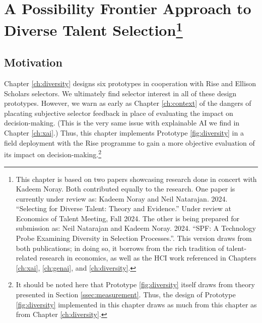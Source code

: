 \chapter[A Possibility Frontier Approach to Diverse Talent Selection]{\label{ch:spf}A Possibility Frontier Approach to Diverse Talent Selection\footnote{This chapter is based on two papers showcasing research done in concert with Kadeem Noray. Both contributed equally to the research. One paper is currently under review as: Kadeem Noray and Neil Natarajan. 2024. “Selecting for Diverse Talent: Theory and Evidence.” Under review at Economics of Talent Meeting, Fall 2024. The other is being prepared for submission as: Neil Natarajan and Kadeem Noray. 2024. “SPF: A Technology Probe Examining Diversity in Selection Processes.”. This version draws from both publications; in doing so, it borrows from the rich tradition of talent-related research in economics, as well as the HCI work referenced in Chapters \ref{ch:xai}, \ref{ch:genai}, and \ref{ch:diversity}.}}

\minitoc

\section{Motivation}
Chapter \ref{ch:diversity} designs six prototypes in cooperation with Rise and Ellison Scholars selectors. We ultimately find selector interest in all of these design prototypes. However, we warn as early as Chapter \ref{ch:context} of the dangers of placating subjective selector feedback in place of evaluating the impact on decision-making. (This is the very same issue with explainable AI we find in Chapter \ref{ch:xai}.) Thus, this chapter implements Prototype \ref{fig:diversity} in a field deployment with the Rise programme to gain a more objective evaluation of its impact on decision-making.\footnote{It should be noted here that Prototype \ref{fig:diversity} itself draws from theory presented in Section \ref{ssec:measurement}. Thus, the design of Prototype \ref{fig:diversity} implemented in this chapter draws as much from this chapter as from Chapter \ref{ch:diversity}.}

